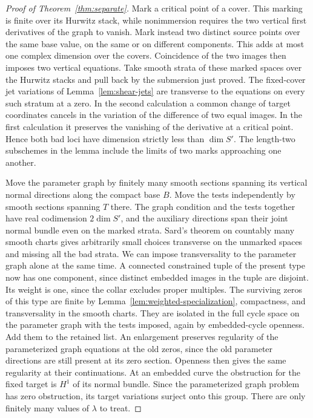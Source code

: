 \begin{proof}[Proof of Theorem~\ref{thm:separate}]
Mark a critical point of a cover. This marking is finite over its
Hurwitz stack, while nonimmersion requires the two vertical first
derivatives of the graph to vanish. Mark instead two distinct source
points over the same base value, on the same or on different
components. This adds at most one complex dimension over the covers.
Coincidence of the two images then imposes two vertical equations.
Take smooth strata of these marked spaces over the Hurwitz stacks
and pull back by the submersion just proved. The fixed-cover jet
variations of Lemma~\ref{lem:shear-jets} are transverse to the
equations on every such stratum at a zero. In the second calculation
a common change of target coordinates cancels in the variation of the
difference of two equal images. In the first calculation it preserves
the vanishing of the derivative at a critical point. Hence both bad
loci have dimension strictly less than $\dim S'$. The length-two
subschemes in the lemma include the limits of two marks approaching
one another.

Move the parameter graph by finitely many smooth sections spanning
its vertical normal directions along the compact base $B$. Move the
tests independently by smooth sections spanning $T$ there. The graph
condition and the tests together have real codimension $2\dim S'$,
and the auxiliary directions span their joint normal bundle even on
the marked strata. Sard's theorem on countably many smooth charts
gives arbitrarily small choices transverse on the unmarked spaces and
missing all the bad strata. We can impose transversality to the
parameter graph alone at the same time. A connected constrained tuple
of the present type now has one component, since distinct embedded
images in the tuple are disjoint. Its weight is one, since the collar
excludes proper multiples. The surviving zeros of this type are
finite by Lemma~\ref{lem:weighted-specialization}, compactness, and
transversality in the smooth charts. They are isolated in the full
cycle space on the parameter graph with the tests imposed, again by
embedded-cycle openness. Add them to the retained list. An enlargement
preserves regularity of the parameterized graph equations at the old
zeros, since the old parameter directions are still present at its
zero section. Openness then gives the same regularity at their
continuations. At an embedded curve the obstruction for the fixed
target is $H^1$ of its normal bundle. Since the parameterized graph
problem has zero obstruction, its target variations surject onto
this group. There are only finitely many values of $\lambda$ to
treat.


\end{proof}
